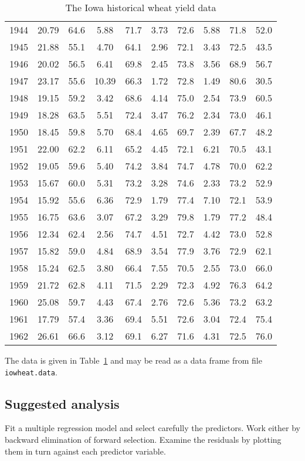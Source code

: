 \documentclass{article}
\newcommand{\strutt}{\vrule height 2.5ex depth 0.5ex width 0ex}%
\newcommand{\code}[1]{\texttt{#1}}
\begin{document}
\begin{table}[ht]
\begin{center}
\begin{tabular}{@{\protect\strutt}|ccccccccc|c|}
 1944 & 20.79 &  64.6 &  5.88 & 71.7 &  3.73 & 72.6 &  5.88 & 71.8 &  52.0\\
 1945 & 21.88 &  55.1 &  4.70 & 64.1 &  2.96 & 72.1 &  3.43 & 72.5 &  43.5\\
 1946 & 20.02 &  56.5 &  6.41 & 69.8 &  2.45 & 73.8 &  3.56 & 68.9 &  56.7\\
 1947 & 23.17 &  55.6 & 10.39 & 66.3 &  1.72 & 72.8 &  1.49 & 80.6 &  30.5\\
 1948 & 19.15 &  59.2 &  3.42 & 68.6 &  4.14 & 75.0 &  2.54 & 73.9 &  60.5\\
 1949 & 18.28 &  63.5 &  5.51 & 72.4 &  3.47 & 76.2 &  2.34 & 73.0 &  46.1\\
 1950 & 18.45 &  59.8 &  5.70 & 68.4 &  4.65 & 69.7 &  2.39 & 67.7 &  48.2\\
 1951 & 22.00 &  62.2 &  6.11 & 65.2 &  4.45 & 72.1 &  6.21 & 70.5 &  43.1\\
 1952 & 19.05 &  59.6 &  5.40 & 74.2 &  3.84 & 74.7 &  4.78 & 70.0 &  62.2\\
 1953 & 15.67 &  60.0 &  5.31 & 73.2 &  3.28 & 74.6 &  2.33 & 73.2 &  52.9\\
 1954 & 15.92 &  55.6 &  6.36 & 72.9 &  1.79 & 77.4 &  7.10 & 72.1 &  53.9\\
 1955 & 16.75 &  63.6 &  3.07 & 67.2 &  3.29 & 79.8 &  1.79 & 77.2 &  48.4\\
 1956 & 12.34 &  62.4 &  2.56 & 74.7 &  4.51 & 72.7 &  4.42 & 73.0 &  52.8\\
 1957 & 15.82 &  59.0 &  4.84 & 68.9 &  3.54 & 77.9 &  3.76 & 72.9 &  62.1\\
 1958 & 15.24 &  62.5 &  3.80 & 66.4 &  7.55 & 70.5 &  2.55 & 73.0 &  66.0\\
 1959 & 21.72 &  62.8 &  4.11 & 71.5 &  2.29 & 72.3 &  4.92 & 76.3 &  64.2\\
 1960 & 25.08 &  59.7 &  4.43 & 67.4 &  2.76 & 72.6 &  5.36 & 73.2 &  63.2\\
 1961 & 17.79 &  57.4 &  3.36 & 69.4 &  5.51 & 72.6 &  3.04 & 72.4 &  75.4\\
 1962 & 26.61 &  66.6 &  3.12 & 69.1 &  6.27 & 71.6 &  4.31 & 72.5 &  76.0\\
\hline
\end{tabular}
\end{center}
\caption{\label{iowheat} The Iowa historical wheat yield data}
\end{table}
The data is given in Table~\ref{iowheat} and may be read as a data frame from
file \code{iowheat.data}.

\subsection*{Suggested analysis}
Fit a multiple regression model and select carefully the predictors.  Work
either by backward elimination of forward selection.  Examine the residuals
by plotting them in turn against each predictor variable.
\end{document}
